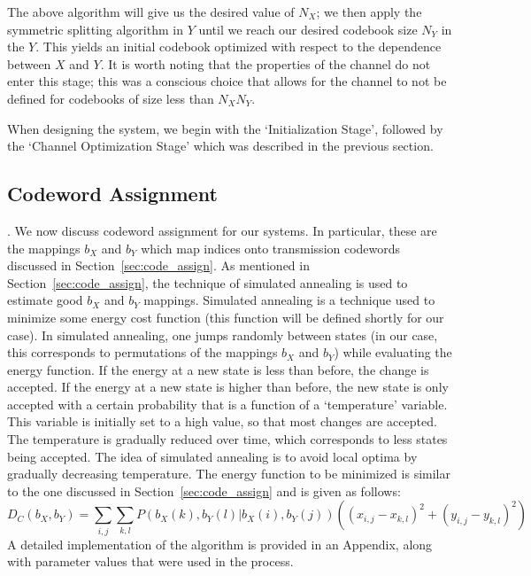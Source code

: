 \documentclass[10pt,twoside,titlepage]{article}
\begin{document}
The above algorithm will give us the desired value of $N_X$; we then apply the symmetric splitting algorithm in $Y$ until we reach our desired codebook size $N_Y$ in the $Y$. This yields an initial codebook optimized with respect to the dependence between $X$ and $Y$. It is worth noting that the properties of the channel do not enter this stage; this was a conscious choice that allows for the channel to not be defined for codebooks of size less than $N_XN_Y$.

When designing the system, we begin with the `Initialization Stage', followed by the `Channel Optimization Stage' which was described in the previous section.

\subsection{Codeword Assignment}
\label{sec:sim_anneal}.
We now discuss codeword assignment for our systems. In particular, these are the mappings $b_X$ and $b_Y$ which map indices onto transmission codewords discussed in Section~\ref{sec:code_assign}. As mentioned in Section~\ref{sec:code_assign}, the technique of simulated annealing is used to estimate good $b_X$ and $b_Y$ mappings. Simulated annealing is a technique used to minimize some energy cost function (this function will be defined shortly for our case). In simulated annealing, one jumps randomly between states (in our case, this corresponds to permutations of the mappings $b_X$ and $b_Y$) while evaluating the energy function. If the energy at a new state is less than before, the change is accepted. If the energy at a new state is higher than before, the new state is only accepted with a certain probability that is a function of a `temperature' variable. This variable is initially set to a high value, so that most changes are accepted. The temperature is gradually reduced over time, which corresponds to less states being accepted. The idea of simulated annealing is to avoid local optima by gradually decreasing temperature. The energy function to be minimized is similar to the one discussed in Section~\ref{sec:code_assign} and is given as follows:
\begin{equation}
    \label{eq:energy}
    D_C(b_X,b_Y)=
        \sum_{i,j}
            \sum_{k,l}
            P(b_X(k), b_Y(l) | b_X(i), b_Y(j))
            \left((x_{i,j}-x_{k,l})^2+(y_{i,j}-y_{k,l})^2\right)
\end{equation}
A detailed implementation of the algorithm is provided in an Appendix, along with parameter values that were used in the process.
\end{document}
